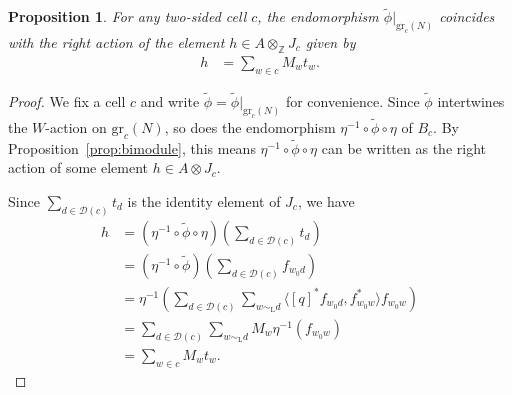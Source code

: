 \documentclass{amsart}
\newtheorem{prop}[thm]{Proposition}
\theoremstyle{definition}
\begin{document}
\begin{prop}\label{prop:jring}
    For any two-sided cell $c$, the endomorphism $\tilde{\phi}|_{\mathrm{gr}_c(N)}$ coincides with the right action of the element $h \in A \otimes_{\mathbb{Z}} J_c$ given by
    \begin{align}
        h & = \sum_{w \in c} M_w t_w.
    \end{align}
\end{prop}
\begin{proof}
    We fix a cell $c$ and write $\tilde{\phi} = \tilde{\phi}|_{\mathrm{gr}_c(N)}$ for convenience. Since $\tilde{\phi}$ intertwines the $W$-action on $\mathrm{gr}_c(N)$, so does the endomorphism $\eta^{-1}\circ \tilde{\phi} \circ \eta$ of $B_c$. By Proposition~\ref{prop:bimodule}, this means $\eta^{-1}\circ \tilde{\phi} \circ \eta$ can be written as the right action of some element $h \in A \otimes J_c$.

    Since $\sum_{d \in \mathcal{D}(c)} t_d$ is the identity element of $J_c$, we have
    \begin{align*}
        h & = (\eta^{-1}\circ \tilde{\phi} \circ \eta)\left(\sum_{d \in \mathcal{D}(c)} t_d\right)\\
        & = (\eta^{-1}\circ \tilde{\phi})\left(\sum_{d \in \mathcal{D}(c)} f_{w_0d}\right)\\
        & = \eta^{-1}\left(\sum_{d \in \mathcal{D}(c)} \sum_{w \sim_\mathrm{L} d} \langle [q]^*f_{w_0d}, f_{w_0w}^*\rangle f_{w_0w}\right)\\
        & = \sum_{d \in \mathcal{D}(c)} \sum_{w \sim_\mathrm{L} d} M_w \eta^{-1}(f_{w_0w}) \\
        & = \sum_{w \in c} M_w t_w.
    \end{align*}
\end{proof}
\end{document}
